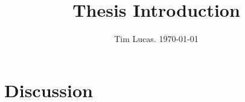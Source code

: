 \documentclass[a4paper,10pt,reqno]{amsart}
\renewcommand{\tableofcontents}{}
\begin{document}
\title{Thesis Introduction}
\author{Tim Lucas. \today}
\date{}

\maketitle

\section{Discussion}






\small
\printbibliography 
\end{document}
